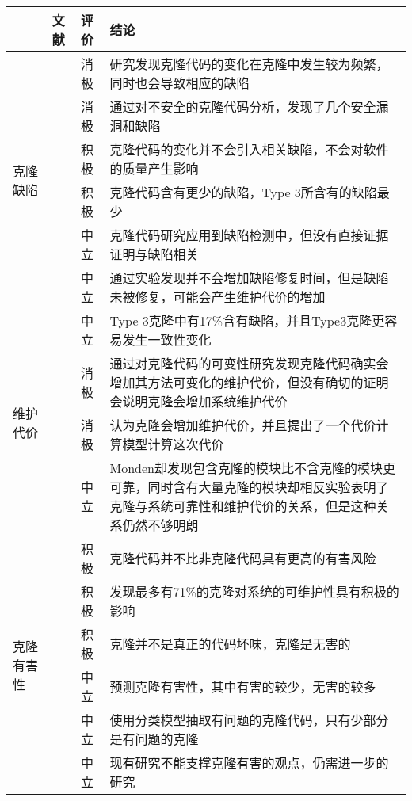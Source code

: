 \begin{table}[htbp]
\centering
{}\vspace{0.5em}\wuhao
\begin{tabularx}{0.9\textwidth}{lllX}
\toprule[1.5pt]
&文献&评价&结论\\
\midrule[1pt]
\multirow{6}{*}{{克隆缺陷}} 
&\cite{juergens2009code}&消极&研究发现克隆代码的变化在克隆中发生较为频繁，同时也会导致相应的缺陷\\
&\cite{gauthier2013uncovering}&消极&通过对不安全的克隆代码分析，发现了几个安全漏洞和缺陷\\
&\cite{bettenburg2009empirical}&积极&克隆代码的变化并不会引入相关缺陷，不会对软件的质量产生影响\\
&\cite{elish2015fault}&积极&克隆代码含有更少的缺陷，Type 3所含有的缺陷最少\\
&\cite{lo2012active}&中立&克隆代码研究应用到缺陷检测中，但没有直接证据证明与缺陷相关\\
&\cite{kamei2011empirical}&中立	&通过实验发现并不会增加缺陷修复时间，但是缺陷未被修复，可能会产生维护代价的增加\\
\midrule[1pt]
\multirow{4}{*}{{维护代价}} 
&\cite{wagner2016relationship}&中立	&Type 3克隆中有17\%含有缺陷，并且Type3克隆更容易发生一致性变化\\
&\cite{harder2012controlled}&消极&通过对克隆代码的可变性研究发现克隆代码确实会增加其方法可变化的维护代价，但没有确切的证明会说明克隆会增加系统维护代价\\
&\cite{juergens2010much}&消极&认为克隆会增加维护代价，并且提出了一个代价计算模型计算这次代价\\
&\cite{monden2002software}&中立&Monden却发现包含克隆的模块比不含克隆的模块更可靠，同时含有大量克隆的模块却相反实验表明了克隆与系统可靠性和维护代价的关系，但是这种关系仍然不够明朗\\
\midrule[1pt]
\multirow{6}{*}{{克隆有害性}} 
&\cite{selim2010studying}&积极&克隆代码并不比非克隆代码具有更高的有害风险\\
&\cite{kapser2006cloning}\cite{kapser2008cloning}&积极	&发现最多有71\%的克隆对系统的可维护性具有积极的影响\\
&\cite{rahman2012clones}&积极	&克隆并不是真正的代码坏味，克隆是无害的\\
&\cite{wang2012can}&中立	&预测克隆有害性，其中有害的较少，无害的较多\\
&\cite{higo2009problematic}&中立&使用分类模型抽取有问题的克隆代码，只有少部分是有问题的克隆\\
&\cite{hordijk2009harmfulness}&中立&现有研究不能支撑克隆有害的观点，仍需进一步的研究\\
\bottomrule[1.5pt]
\end{tabularx}
\end{table}

